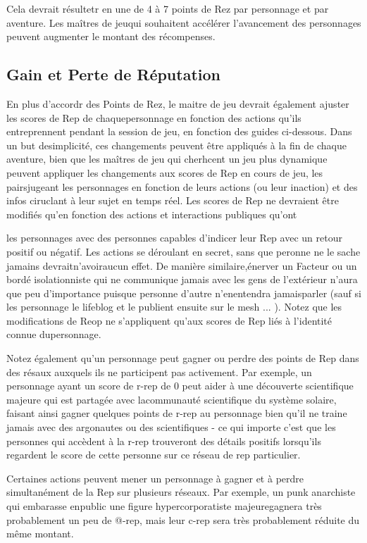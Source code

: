 {Cela devrait résultetr en une de 4 à 7 points de Rez par personnage et par aventure. Les maîtres de jeuqui souhaitent accélérer l'avancement des personnages peuvent augmenter le montant des récompenses. 

\subsection{Gain et Perte de Réputation} 

En plus d'accordr des Points de Rez, le maitre de jeu devrait également ajuster les scores de Rep de chaquepersonnage en fonction des actions qu'ils entreprennent pendant la session de jeu, en fonction des guides ci-dessous. Dans un but desimplicité, ces changements peuvent être appliqués à la fin de chaque aventure, bien que les maîtres de jeu qui cherhcent un jeu plus dynamique peuvent appliquer les changements aux scores de Rep en cours de jeu, les pairsjugeant les personnages en fonction de leurs actions (ou leur inaction) et des infos ciruclant à leur sujet en temps réel. Les scores de Rep ne devraient être modifiés qu'en fonction des actions et interactions publiques qu'ont 

les personnages avec des personnes capables d'indicer leur Rep avec un retour positif ou négatif. Les actions se déroulant en secret, sans que peronne ne le sache jamains devraitn'avoiraucun effet. De manière similaire,énerver un Facteur ou un bordé isolationniste qui ne communique jamais avec les gens de l'extérieur n'aura que peu d'importance puisque personne d'autre n'enentendra jamaisparler (sauf si les personnage le lifeblog et le publient ensuite sur le mesh ... ). Notez que les modifications de Reop ne s'appliquent qu'aux scores de Rep liés à l'identité connue dupersonnage. 

Notez également qu'un personnage peut gagner ou perdre des points de Rep dans des résaux auxquels ils ne participent pas activement. Par exemple, un personnage ayant un score de r-rep de 0 peut aider à une découverte scientifique majeure qui est partagée avec lacommunauté scientifique du système solaire, faisant ainsi gagner quelques points de r-rep au personnage bien qu'il ne traine jamais avec des argonautes ou des scientifiques - ce qui importe c'est que les personnes qui accèdent à la r-rep trouveront des détails positifs lorsqu'ils regardent le score de cette personne sur ce réseau de rep particulier. 

Certaines actions peuvent mener un personnage à gagner et à perdre simultanément de la Rep sur plusieurs réseaux. Par exemple, un punk anarchiste qui embarasse enpublic une figure hypercorporatiste majeuregagnera très probablement un peu de @-rep, mais leur c-rep sera très probablement réduite du même montant. 

}
